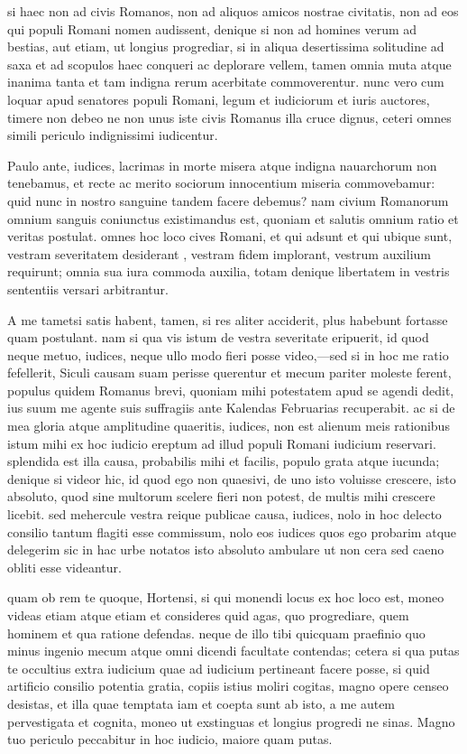  si haec non ad civis Romanos, non ad aliquos amicos nostrae civitatis, non ad eos qui populi Romani nomen audissent, denique si non ad homines verum ad bestias, aut etiam, ut longius progrediar, si in aliqua desertissima solitudine ad saxa et ad scopulos haec conqueri ac deplorare vellem, tamen omnia muta atque inanima tanta et tam indigna rerum acerbitate commoverentur. nunc vero cum loquar apud senatores populi Romani, legum et iudiciorum et iuris auctores, timere non debeo ne non unus iste civis Romanus illa cruce dignus, ceteri omnes simili periculo indignissimi iudicentur.

 Paulo ante, iudices, lacrimas in morte misera atque indigna nauarchorum non tenebamus, et recte ac merito sociorum innocentium miseria commovebamur: quid nunc in nostro sanguine tandem facere debemus? nam civium Romanorum omnium sanguis coniunctus existimandus est, quoniam et salutis omnium ratio et veritas postulat. omnes hoc loco cives Romani, et qui adsunt et qui ubique sunt, vestram severitatem desiderant , vestram fidem implorant, vestrum auxilium requirunt; omnia sua iura commoda auxilia, totam denique libertatem in vestris sententiis versari arbitrantur.

 A me tametsi satis habent, tamen, si res aliter acciderit, plus habebunt fortasse quam postulant. nam si qua vis istum de vestra severitate eripuerit, id quod neque metuo, iudices, neque ullo modo fieri posse video,—sed si in hoc me ratio fefellerit, Siculi causam suam perisse querentur et mecum pariter moleste ferent, populus quidem Romanus brevi, quoniam mihi potestatem apud se agendi dedit, ius suum me agente suis suffragiis ante Kalendas Februarias recuperabit. ac si de mea gloria atque amplitudine quaeritis, iudices, non est alienum meis rationibus istum mihi ex hoc iudicio ereptum ad illud populi Romani iudicium reservari. splendida est illa causa, probabilis mihi et facilis, populo grata atque iucunda; denique si videor hic, id quod ego non quaesivi, de uno isto voluisse crescere, isto absoluto, quod sine multorum scelere fieri non potest, de multis mihi crescere licebit. sed mehercule vestra reique publicae causa, iudices, nolo in hoc delecto consilio tantum flagiti esse commissum, nolo eos iudices quos ego probarim atque delegerim sic in hac urbe notatos isto absoluto ambulare ut non cera sed caeno obliti esse videantur.

 quam ob rem te quoque, Hortensi, si qui monendi locus ex hoc loco est, moneo videas etiam atque etiam et consideres quid agas, quo progrediare, quem hominem et qua ratione defendas. neque de illo tibi quicquam praefinio quo minus ingenio mecum atque omni dicendi facultate contendas; cetera si qua putas te occultius extra iudicium quae ad iudicium pertineant facere posse, si quid artificio consilio potentia gratia, copiis istius moliri cogitas, magno opere censeo desistas, et illa quae temptata iam et coepta sunt ab isto, a me autem pervestigata et cognita, moneo ut exstinguas et longius progredi ne sinas. Magno tuo periculo peccabitur in hoc iudicio, maiore quam putas.

